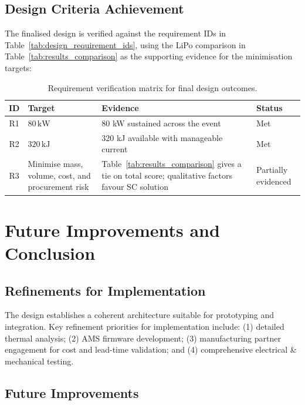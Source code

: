 \documentclass[11pt, a4paper]{report}
\numberwithin{equation}{section}
\begin{document}
\begin{refsection}
\subsection{Design Criteria Achievement}
\label{sec:design_criteria_achievement}
The finalised design is verified against the requirement IDs in Table~\ref{tab:design_requirement_ids}, using the LiPo comparison in Table~\ref{tab:results_comparison} as the supporting evidence for the minimisation targets:

\begin{table}[htbp]
    \centering
    \caption{Requirement verification matrix for final design outcomes.}
    \label{tab:design_verification_matrix}
    \footnotesize
    \setlength{\tabcolsep}{4pt}
    \renewcommand{\arraystretch}{0.95}
    \begin{tabular}{|c|p{5cm}|p{7.5cm}|p{2cm}|}
        \hline
        \textbf{ID} & \textbf{Target} & \textbf{Evidence} & \textbf{Status} \\
        \hline
        R1 & $80\,\text{kW}$ & 80 kW sustained across the event & Met \\
        R2 & $320\,\text{kJ}$ & 320 kJ available with manageable current & Met \\
        R3 & Minimise mass, volume, cost, and procurement risk & Table~\ref{tab:results_comparison} gives a tie on total score; qualitative factors favour SC solution & Partially evidenced \\
        \hline
    \end{tabular}
\end{table}

\section{Future Improvements and Conclusion}
\label{sec:future_improvements_conclusion}

\subsection{Refinements for Implementation}
The design establishes a coherent architecture suitable for prototyping and integration. Key refinement priorities for implementation include: (1) detailed thermal analysis; (2) AMS firmware development; (3) manufacturing partner engagement for cost and lead-time validation; and (4) comprehensive electrical \& mechanical testing.

\subsection{Future Improvements}


\end{refsection}
\end{document}
